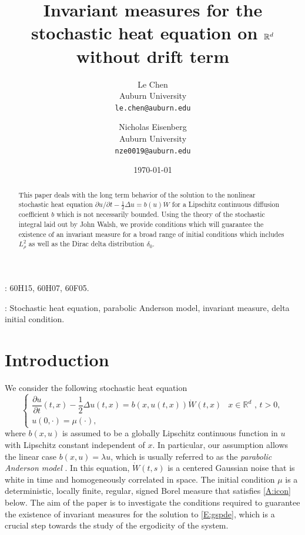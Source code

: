 \documentclass[a4paper,11pt]{article}%
\title{Invariant measures for the stochastic heat equation on $\R^d$ without drift term}
\author{Le Chen\\Auburn University\\\texttt{le.chen@auburn.edu}\\
	\and
		Nicholas Eisenberg\\Auburn University\\\texttt{nze0019@auburn.edu}
	}
\date{\today}
\numberwithin{equation}{section}
\theoremstyle{plain}
\theoremstyle{definition}
\newcommand{\R}{\mathbb{R}}
\begin{document}
\maketitle


\begin{abstract}
	This paper deals with the long term behavior of the solution to the nonlinear stochastic heat equation
	$\partial u /\partial t - \frac{1}{2}\Delta u= b(u)\dot{W}$ for a Lipschitz continuous diffusion coefficient
	$b$ which is not necessarily bounded. Using the theory of the stochastic integral laid out by John Walsh,
	we provide conditions which will guarantee the existence of an invariant measure for a broad range of initial
	conditions which includes $L^2_\rho$ as well as the Dirac delta distribution $\delta_0$.
\end{abstract}
\bigskip

: 60H15, 60H07, 60F05.
\smallskip

: Stochastic heat equation, parabolic Anderson model, invariant measure, delta initial condition.
\smallskip


\tableofcontents

\section{Introduction}
We consider the following stochastic heat equation
\begin{equation}
  \label{E:gspde}
	\begin{cases}
		\dfrac{\partial u}{\partial t}(t,x)-\dfrac{1}{2}\Delta u(t,x) = b(x,u(t,x))\dot W(t,x) & \text{$x\in \R^d$ , $t>0$}, \\
		u(0,\cdot) = \mu(\cdot),                                                               &
	\end{cases}
\end{equation}
where $b(x,u)$ is assumed to be a globally Lipschitz continuous function in $u$ with Lipschitz
constant independent of $x$.  In particular, our assumption allows the linear case $b(x,u) = \lambda
u$, which is usually referred to as the \textit{parabolic Anderson model} \cite{CarMol94}. In this
equation, $\dot{W}(t,s)$ is a centered Gaussian noise that is white in time and homogeneously
correlated in space. The initial condition $\mu$ is a deterministic, locally finite, regular, signed
Borel measure that satisfies \eqref{A:icon} below. The aim of the paper is to investigate the
conditions required to guarantee the existence of invariant measures for the solution to
\eqref{E:gspde}, which is a crucial step towards the study of the ergodicity of the system.
\end{document}

